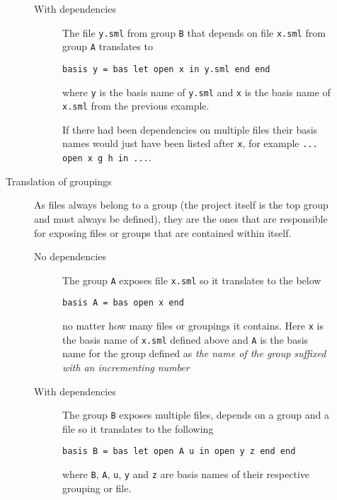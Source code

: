 \begin{description}
\begin{description}
\begin{description}
    \item[With dependencies] 

      The file \texttt{y.sml} from group \texttt{B} that depends on file
      \texttt{x.sml} from group \texttt{A} translates to

\begin{lstlisting}
basis y = bas let open x in y.sml end end
\end{lstlisting}

      where \texttt{y} is the basis name of \texttt{y.sml} and \texttt{x} is the
      basis name of \texttt{x.sml} from the previous example.

      If there had been dependencies on multiple files their basis names would
      just have been listed after \texttt{x}, for example \texttt{... open x g h
        in ...}.

    \end{description}

  \item[Translation of groupings] 

    As files always belong to a group (the project itself is the top group and
    must always be defined), they are the ones that are responsible for exposing
    files or groups that are contained within itself.

    \begin{description}
    \item[No dependencies] 

      The group \texttt{A} exposes file \texttt{x.sml} so it translates to the
      below

\begin{lstlisting}
basis A = bas open x end
\end{lstlisting}

      no matter how many files or groupings it contains. Here \texttt{x} is the
      basis name of \texttt{x.sml} defined above and \texttt{A} is the basis
      name for the group defined as \textit{the name of the group suffixed with
        an incrementing number}

    \item[With dependencies] 
      The group \texttt{B} exposes multiple files, depends on a group and a file
      so it translates to the following

\begin{lstlisting}
basis B = bas let open A u in open y z end end
\end{lstlisting}

      where \texttt{B}, \texttt{A}, \texttt{u}, \texttt{y} and \texttt{z} are
      basis names of their respective grouping or file.
    \end{description}



\end{description}
\end{description}

